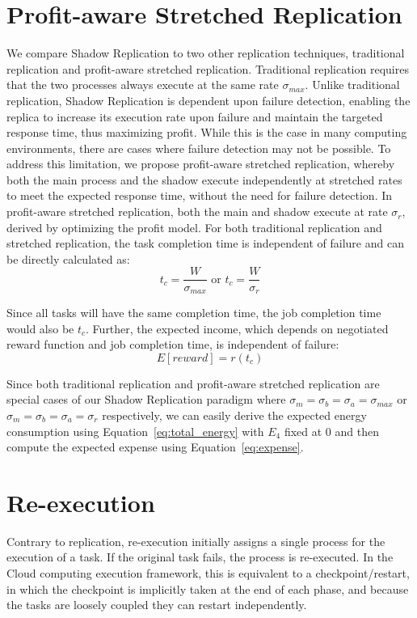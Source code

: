 \section{Profit-aware Stretched Replication}
We compare Shadow Replication to two other replication techniques,
traditional replication and profit-aware stretched replication.
Traditional replication requires that the two processes always execute
at the same rate $\sigma_{max}$. Unlike traditional replication,
Shadow Replication is dependent upon failure detection, enabling the
replica to increase its execution rate upon failure and maintain the
targeted response time, thus maximizing profit. While this is the case
in many computing environments, there are cases where failure
detection may not be possible. To address this limitation, we propose
profit-aware stretched replication, whereby both the main process and
the shadow execute independently at stretched rates to meet the
expected response time, without the need for failure
detection. In profit-aware stretched replication, both the main and
shadow execute at rate $\sigma_r$, derived by optimizing the profit
model.  For both traditional replication and stretched replication,
the task completion time is independent of failure and can be directly
calculated as:
\begin{equation}
t_c=\frac{W}{\sigma_{max}} \text{ or } t_c=\frac{W}{\sigma_r}
\end{equation}

Since all tasks will have the same completion time, the job completion
time would also be $t_c$. Further, the expected income, which depends
on negotiated reward function and job completion time, is independent
of failure:
\begin{equation}
E[reward]=r(t_c)
\end{equation}

Since both traditional replication and profit-aware stretched
replication are special cases of our Shadow Replication paradigm where
$\sigma_m=\sigma_b=\sigma_a=\sigma_{max}$ or
$\sigma_m=\sigma_b=\sigma_a=\sigma_r$ respectively, we can easily derive the
expected energy consumption using Equation~\ref{eq:total_energy} with $E_4$
fixed at 0 and then compute the expected expense using Equation~\ref{eq:expense}.

\section{Re-execution} 
Contrary to replication, re-execution initially assigns a single
process for the execution of a task. If the original task fails, the
process is re-executed. In the Cloud computing execution framework,
this is equivalent to a checkpoint/restart, in which the checkpoint is
implicitly taken at the end of each phase, and because the tasks are
loosely coupled they can restart independently. 

